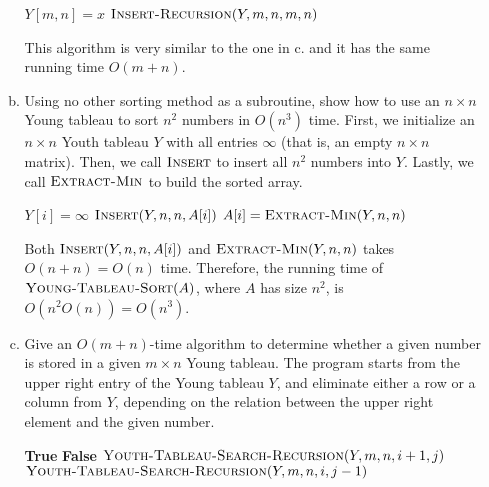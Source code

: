 \documentclass[12pt,reqno]{amsart}
\newif\ifanswer
\begin{document}
\begin{enumerate}[1.]
\begin{enumerate}[a.]
    \begin{algorithm}
        \caption{$\textsc{Insert}(Y, m, n, x)$}
        \begin{algorithmic}[1]
            \STATE $Y[m, n] = x$
            \STATE $\textsc{Insert-Recursion}(Y, m, n, m, n)$
        \end{algorithmic}
    \end{algorithm}
    This algorithm is very similar to the one in c. and it has the same running time $O(m + n)$.
    \vspace{1cm}
    \item Using no other sorting method as a subroutine, show how to use an $n\times n$ Young tableau to sort $n^2$ numbers in $O(n^3)$ time.
    \ifanswer
    \noindent {\bf \\Solution}
    First, we initialize an $n\times n$ Youth tableau $Y$ with all entries $\infty$ (that is, an empty $n\times n$ matrix). Then, we call $\textsc{Insert}$ to insert all $n^2$ numbers into $Y$. Lastly, we call $\textsc{Extract-Min}$ to build the sorted array.\\
    \begin{algorithm}
        \caption{$\textsc{Young-Tableau-Sort}(A)$}
        \begin{algorithmic}[1]
                \STATE $Y[i] = \infty$
            \ENDFOR
                \STATE $\textsc{Insert}(Y, n, n, A[i])$
            \ENDFOR
                \STATE $A[i] = \textsc{Extract-Min}(Y, n, n)$
            \ENDFOR
        \end{algorithmic}
    \end{algorithm}
    \newpage Both $\textsc{Insert}(Y, n, n, A[i])$ and $\textsc{Extract-Min}(Y, n, n)$ takes $O(n + n) = O(n)$ time. Therefore, the running time of $\textsc{Young-Tableau-Sort}(A)$, where $A$ has size $n^2$, is $O(n^2O(n)) = O(n^3)$.
    \vspace{1cm}
    \item Give an $O(m + n)$-time algorithm to determine whether a given number is stored in a given $m\times n$ Young tableau.
    \ifanswer
    \noindent {\bf \\Solution}
    The program starts from the upper right entry of the Young tableau $Y$, and eliminate either a row or a column from $Y$, depending on the relation between the upper right element and the given number.
    \begin{algorithm}
        \caption{$\textsc{Youth-Tableau-Search-Recursion}(Y, m, n, x, i, j)$}
        \begin{algorithmic}[1]
                \RETURN \textbf{True}
            \ENDIF
                \RETURN \textbf{False}
            \ENDIF
                \RETURN $\textsc{Youth-Tableau-Search-Recursion}(Y, m, n, i + 1, j)$
            \ELSE
                \RETURN $\textsc{Youth-Tableau-Search-Recursion}(Y, m, n, i, j - 1)$
            \ENDIF
        \end{algorithmic}
    \end{algorithm}
    

\end{enumerate}
\end{enumerate}
\end{document}
